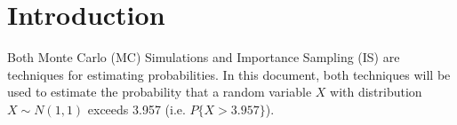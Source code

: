 \documentclass[conference]{IEEEtran}
\begin{document}
\section{Introduction}
Both Monte Carlo (MC) Simulations and Importance Sampling (IS) are techniques for estimating probabilities. In this document, both techniques will be used to estimate the probability that a random variable $X$ with distribution $X\sim N(1,1)$ exceeds 3.957 (i.e. $P\{X > 3.957\}$).  
\end{document}
